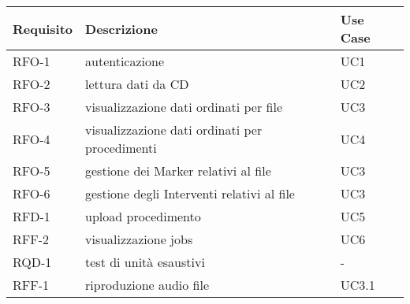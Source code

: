 \newpage

\label{sec:requisiti}
\begin{center}
  \renewcommand{\arraystretch}{1.8} %
  \begin{tabular}{ |p{2cm}|p{9cm}|p{2cm}| }
    \hline
    \textbf{Requisito} & \textbf{Descrizione}                           & \textbf{Use Case} \\
    \hline
    RFO-1              & autenticazione                                 & UC1               \\
    \hline
    RFO-2              & lettura dati da CD                             & UC2               \\
    \hline
    RFO-3              & visualizzazione dati ordinati per file         & UC3               \\
    \hline
    RFO-4              & visualizzazione dati ordinati per procedimenti & UC4               \\
    \hline
    RFO-5              & gestione dei Marker relativi al file           & UC3               \\
    \hline
    RFO-6              & gestione degli Interventi relativi al file     & UC3               \\
    \hline
    RFD-1              & upload procedimento                            & UC5               \\
    \hline
    RFF-2              & visualizzazione jobs                           & UC6               \\
    \hline
    RQD-1              & test di unità esaustivi                        & -                 \\
    \hline
    RFF-1              & riproduzione audio file                        & UC3.1             \\
    \hline
  \end{tabular}
\end{center}
